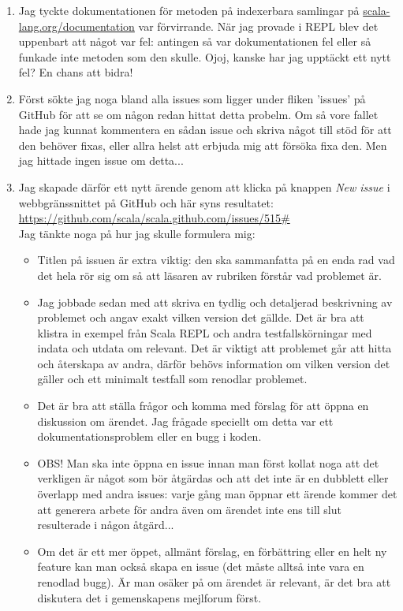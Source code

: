\begin{enumerate}

\item Jag tyckte dokumentationen för metoden  på indexerbara samlingar på \href{http://scala-lang.org/documentation/}{scala-lang.org/documentation} var förvirrande. När jag provade i REPL blev det uppenbart att något var fel: antingen så var dokumentationen fel eller så funkade inte metoden som den skulle. Ojoj, kanske har jag upptäckt ett nytt fel? En chans att bidra!

\item Först sökte jag noga bland alla issues som ligger under fliken 'issues' på GitHub för att se om någon redan hittat detta probelm. Om så vore fallet hade jag kunnat kommentera en sådan issue och skriva något till stöd för att den behöver fixas, eller allra helst att erbjuda mig att försöka fixa den. Men jag hittade ingen issue om detta...

\item Jag skapade därför ett nytt ärende genom att klicka på knappen \emph{New issue} i webbgränssnittet på GitHub och här syns resultatet: \\ \url{https://github.com/scala/scala.github.com/issues/515#} \\ Jag tänkte noga på hur jag skulle formulera mig: 

\begin{itemize}[nolistsep, noitemsep]
  \item Titlen på issuen är extra viktig: den ska sammanfatta på en enda rad vad det hela rör sig om så att läsaren av rubriken förstår vad problemet är. 
  \item Jag jobbade sedan med att skriva en tydlig och detaljerad beskrivning av problemet och angav exakt vilken version det gällde. Det är bra att klistra in exempel från Scala REPL och andra testfallskörningar med indata och utdata om relevant. Det är viktigt att problemet går att hitta och återskapa av andra, därför behövs information om vilken version det gäller och ett minimalt testfall som renodlar problemet.
  \item Det är bra att ställa frågor och komma med förslag för att öppna en diskussion om ärendet. Jag frågade speciellt om detta var ett dokumentationsproblem eller en bugg i koden.
  \item OBS! Man ska inte öppna en issue innan man först kollat noga att det verkligen är något som bör åtgärdas och att det inte är en dubblett eller överlapp med andra issues: varje gång man öppnar ett ärende kommer det att generera arbete för andra även om ärendet inte ens till slut resulterade i någon åtgärd... 
  \item Om det är ett mer öppet, allmänt förslag, en förbättring eller en helt ny feature kan man också skapa en issue (det måste alltså inte vara en renodlad bugg). Är man osäker på om ärendet är relevant, är det bra att diskutera det i gemenskapens mejlforum först.
\end{itemize}


\end{enumerate}
